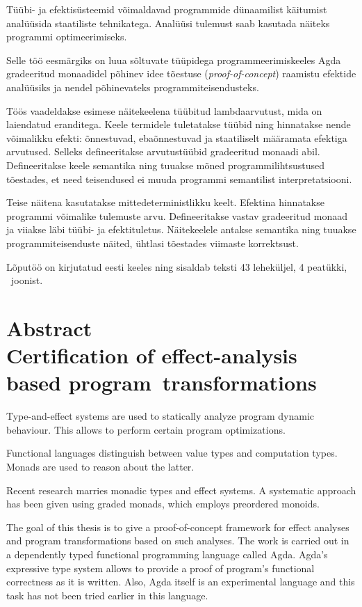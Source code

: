 \documentclass[a4paper,12pt]{article}
\begin{document}
Tüübi- ja efektisüsteemid võimaldavad programmide dünaamilist käitumist analüüsida staatiliste tehnikatega. Analüüsi tulemust saab kasutada näiteks programmi optimeerimiseks.

Selle töö eesmärgiks on luua sõltuvate tüüpidega programmeerimiskeeles Agda gradeeritud monaadidel põhinev idee tõestuse (\emph{proof-of-concept}) raamistu efektide analüüsiks ja nendel põhinevateks programmiteisendusteks.

Töös vaadeldakse esimese näitekeelena tüübitud lambdaarvutust, mida on laiendatud eranditega.
Keele termidele tuletatakse tüübid ning hinnatakse nende võimalikku efekti: õnnestuvad, ebaõnnestuvad ja staatiliselt määramata efektiga arvutused.
Selleks defineeritakse arvutustüübid gradeeritud monaadi abil.
Defineeritakse keele semantika ning tuuakse mõned programmilihtsustused tõestades, et need teisendused ei muuda programmi semantilist interpretatsiooni.

Teise näitena kasutatakse mittedeterministlikku keelt.
Efektina hinnatakse programmi võimalike tulemuste arvu.
Defineeritakse vastav gradeeritud monaad ja viiakse läbi tüübi- ja efektituletus.
Näitekeelele antakse semantika ning tuuakse programmiteisenduste näited, ühtlasi tõestades viimaste korrektsust.


Lõputöö on kirjutatud eesti keeles ning sisaldab teksti 43 leheküljel, 4 peatükki, \totalfigures~joonist.
\clearpage\vspace*{0pt}

\section*{\centering Abstract\\
Certification of effect-analysis based program~transformations}

Type-and-effect systems are used to statically analyze program dynamic behaviour.
This allows to perform certain program optimizations.

Functional languages distinguish between value types and computation types.
Monads are used to reason about the latter.

Recent research marries monadic types and effect systems.
A systematic approach has been given using graded monads, which employs preordered monoids.

The goal of this thesis is to give a proof-of-concept framework for effect analyses and program transformations based on such analyses.
The work is carried out in a dependently typed functional programming language called Agda.
Agda's expressive type system allows to provide a proof of program's functional correctness as it is written.
Also, Agda itself is an experimental language and this task has not been tried earlier in this language.
\end{document}
